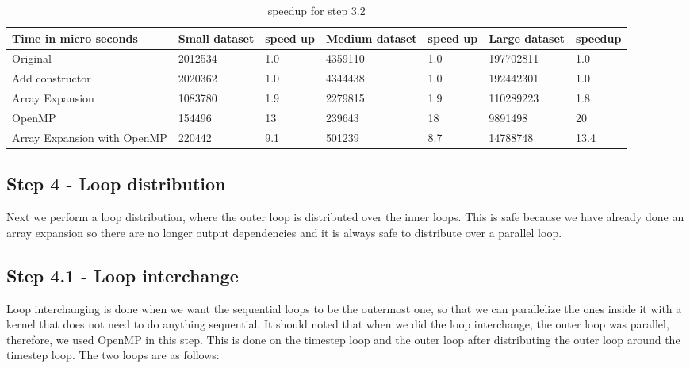 \documentclass{article}
\begin{document}
\begin{table}[ht]
\centering
\caption{speedup for step 3.2}
\label{my-label4}
\begin{tabular}{|l|l|l|l|l|l|l|}
\hline
Time in micro seconds& Small dataset & speed up & Medium dataset & speed up & Large dataset & speedup \\ \hline
Original         & 2012534       &  1.0        & 4359110        &  1.0        & 197702811     &  1.0       \\ \hline
Add constructor  & 2020362       &  1.0        & 4344438        &  1.0        & 192442301     &  1.0       \\ \hline
Array Expansion  & 1083780       &  1.9        & 2279815        &  1.9        & 110289223     &  1.8        \\ \hline
OpenMP           & 154496        &  13         & 239643         &  18         & 9891498       &  20       \\ \hline
Array Expansion with OpenMP     & 220442         &  9.1        & 501239         &  8.7        & 14788748      &  13.4       \\ \hline
\end{tabular}
\end{table}

\subsection*{Step 4 - Loop distribution}
Next we perform a loop distribution, where the outer loop is distributed over the inner loops. This is safe because we have already done an array expansion so there are no longer output dependencies and it is always safe to distribute over a parallel loop.
\subsection*{Step 4.1 - Loop interchange}
Loop interchanging is done when we want the sequential loops to be the outermost one, so that we can parallelize the ones inside it with a kernel that does not need to do anything sequential. It should noted that when we did the loop interchange, the outer loop was parallel, therefore, we used OpenMP in this step. This is done on the timestep loop and the outer loop after distributing the outer loop around the timestep loop. The two loops are as follows:
\end{document}
